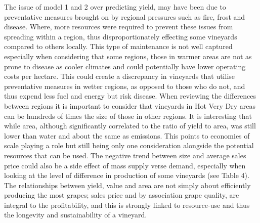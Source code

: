 \documentclass[review,12pt,authoryear]{elsarticle}
\begin{document}
\begin{linenumbers}
The issue of model 1 and 2 over predicting yield, may have been due to preventative measures brought on by regional pressures such as fire, frost and disease. Where, more resources were required to prevent these issues from spreading within a region, thus disproportionately effecting some vineyards compared to others locally. This type of maintenance is not well captured especially when considering that some regions, those in warmer areas are not as prone to disease as cooler climates and could potentially have lower operating costs per hectare. This could create a discrepancy in vineyards that utilise preventative measures in wetter regions, as opposed to those who do not, and thus expend less fuel and energy but risk disease. When reviewing the differences between regions it is important to consider that vineyards in Hot Very Dry areas can be hundreds of times the size of those in other regions. It is interesting that while area, although significantly correlated to the ratio of yield to area, was still lower than water and about the same as emissions. This points to economies of scale playing a role but still being only one consideration alongside the potential resources that can be used. The negative trend between size and average sales price could also be a side effect of mass supply verse demand, especially when looking at the level of difference in production of some vineyards (see Table 4). The relationships between yield, value and area are not simply about efficiently producing the most grapes; sales price and by association grape quality, are integral to the profitability, and this is strongly linked to resource-use and thus the longevity and sustainability of a vineyard. 


\end{linenumbers}
\end{document}
